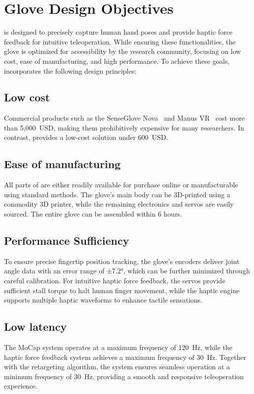 
\section{Glove Design Objectives}

\oursystem is designed to precisely capture human hand poses and provide haptic force feedback for intuitive teleoperation. While ensuring these functionalities, the glove is optimized for accessibility by the research community, focusing on low cost, ease of manufacturing, and high performance. To achieve these goals, \oursystem incorporates the following design principles:

\subsection{\textbf{Low cost}}
Commercial products such as the SenseGlove Nova~\cite{senseglove} and Manus VR~\cite{manusmeta} cost more than 5,000~USD, making them prohibitively expensive for many researchers. In contrast, \oursystem provides a low-cost solution under 600~USD.

\subsection{\textbf{Ease of manufacturing}}
All parts of \oursystem are either readily available for purchase online or manufacturable using standard methods. The glove’s main body can be 3D-printed using a commodity 3D printer, while the remaining electronics and servos are easily sourced. The entire glove can be assembled within 6 hours.

\subsection{\textbf{Performance Sufficiency}}
To ensure precise fingertip position tracking, the glove's encoders deliver joint angle data with an error range of ±7.2°, which can be further minimized through careful calibration. For intuitive haptic force feedback, the servos provide sufficient stall torque to halt human finger movement, while the haptic engine supports multiple haptic waveforms to enhance tactile sensations.

\subsection{\textbf{Low latency}}
The MoCap system operates at a maximum frequency of 120~Hz, while the haptic force feedback system achieves a maximum frequency of 30~Hz. Together with the retargeting algorithm, the system ensures seamless operation at a minimum frequency of 30~Hz, providing a smooth and responsive teleoperation experience.
